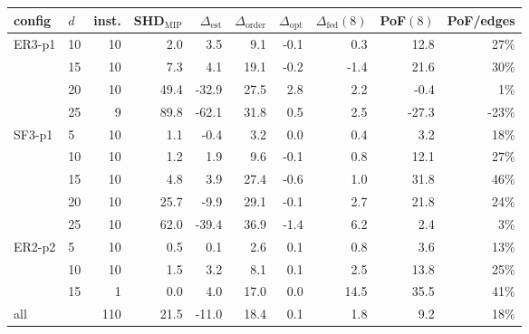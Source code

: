 \begin{tabular}{llr r rrrr r r}
\toprule
config & $d$ & inst. & SHD$_{\mathrm{MIP}}$ & $\Delta_{\mathrm{est}}$ & $\Delta_{\mathrm{order}}$ & $\Delta_{\mathrm{opt}}$ & $\Delta_{\mathrm{fed}}(8)$ & PoF$(8)$ & PoF/edges \\
\midrule
ER3-p1 & 10 & 10 & 2.0 & 3.5 & 9.1 & -0.1 & 0.3 & 12.8 & 27\% \\
 & 15 & 10 & 7.3 & 4.1 & 19.1 & -0.2 & -1.4 & 21.6 & 30\% \\
 & 20 & 10 & 49.4 & -32.9 & 27.5 & 2.8 & 2.2 & -0.4 & 1\% \\
 & 25 & 9 & 89.8 & -62.1 & 31.8 & 0.5 & 2.5 & -27.3 & -23\% \\
\midrule
SF3-p1 & 5 & 10 & 1.1 & -0.4 & 3.2 & 0.0 & 0.4 & 3.2 & 18\% \\
 & 10 & 10 & 1.2 & 1.9 & 9.6 & -0.1 & 0.8 & 12.1 & 27\% \\
 & 15 & 10 & 4.8 & 3.9 & 27.4 & -0.6 & 1.0 & 31.8 & 46\% \\
 & 20 & 10 & 25.7 & -9.9 & 29.1 & -0.1 & 2.7 & 21.8 & 24\% \\
 & 25 & 10 & 62.0 & -39.4 & 36.9 & -1.4 & 6.2 & 2.4 & 3\% \\
\midrule
ER2-p2 & 5 & 10 & 0.5 & 0.1 & 2.6 & 0.1 & 0.8 & 3.6 & 13\% \\
 & 10 & 10 & 1.5 & 3.2 & 8.1 & 0.1 & 2.5 & 13.8 & 25\% \\
 & 15 & 1 & 0.0 & 4.0 & 17.0 & 0.0 & 14.5 & 35.5 & 41\% \\
\midrule
all & & 110 & 21.5 & -11.0 & 18.4 & 0.1 & 1.8 & 9.2 & 18\% \\
\bottomrule
\end{tabular}
